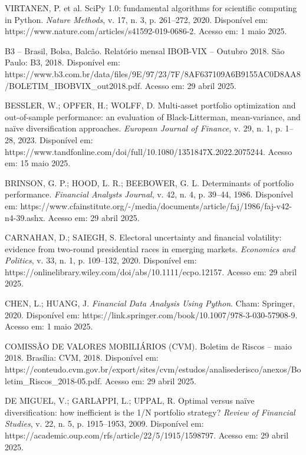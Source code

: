 \begin{thebibliography}{99}

VIRTANEN, P. et al. SciPy 1.0: fundamental algorithms for scientific computing in Python. \textit{Nature Methods}, v. 17, n. 3, p. 261--272, 2020. Disponível em: https://www.nature.com/articles/s41592-019-0686-2. Acesso em: 1 maio 2025.

B3 -- Brasil, Bolsa, Balcão. Relatório mensal IBOB-VIX -- Outubro 2018. São Paulo: B3, 2018. Disponível em: https://www.b3.com.br/data/files/9E/97/23/7F/8AF637109A6B9155AC0D8AA8/BOLETIM\_IBOBVIX\_out2018.pdf. Acesso em: 29 abril 2025.

BESSLER, W.; OPFER, H.; WOLFF, D. Multi-asset portfolio optimization and out-of-sample performance: an evaluation of Black-Litterman, mean-variance, and naïve diversification approaches. \textit{European Journal of Finance}, v. 29, n. 1, p. 1--28, 2023. Disponível em: https://www.tandfonline.com/doi/full/10.1080/1351847X.2022.2075244. Acesso em: 15 maio 2025.

BRINSON, G. P.; HOOD, L. R.; BEEBOWER, G. L. Determinants of portfolio performance. \textit{Financial Analysts Journal}, v. 42, n. 4, p. 39--44, 1986. Disponível em: https://www.cfainstitute.org/-/media/documents/article/faj/1986/faj-v42-n4-39.ashx. Acesso em: 29 abril 2025.

CARNAHAN, D.; SAIEGH, S. Electoral uncertainty and financial volatility: evidence from two-round presidential races in emerging markets. \textit{Economics and Politics}, v. 33, n. 1, p. 109--132, 2020. Disponível em: https://onlinelibrary.wiley.com/doi/abs/10.1111/ecpo.12157. Acesso em: 29 abril 2025.

CHEN, L.; HUANG, J. \textit{Financial Data Analysis Using Python}. Cham: Springer, 2020. Disponível em: https://link.springer.com/book/10.1007/978-3-030-57908-9. Acesso em: 1 maio 2025.

COMISSÃO DE VALORES MOBILIÁRIOS (CVM). Boletim de Riscos -- maio 2018. Brasília: CVM, 2018. Disponível em: https://conteudo.cvm.gov.br/export/sites/cvm/estudos/analisederisco/anexos/Boletim\_Riscos\_2018-05.pdf. Acesso em: 29 abril 2025.

DE MIGUEL, V.; GARLAPPI, L.; UPPAL, R. Optimal versus naïve diversification: how inefficient is the 1/N portfolio strategy? \textit{Review of Financial Studies}, v. 22, n. 5, p. 1915--1953, 2009. Disponível em: https://academic.oup.com/rfs/article/22/5/1915/1598797. Acesso em: 29 abril 2025.


\end{thebibliography}
